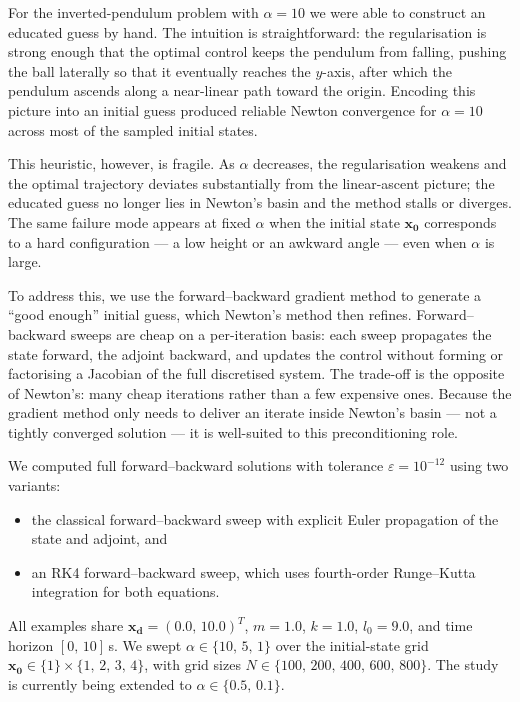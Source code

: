 \documentclass[a4paper, 10pt]{article}
\begin{document}
For the inverted-pendulum problem with $\alpha = 10$ we were able to
construct an educated guess by hand. The intuition is straightforward: the
regularisation is strong enough that the optimal control keeps the
pendulum from falling, pushing the ball laterally so that it eventually
reaches the $y$-axis, after which the pendulum ascends along a near-linear
path toward the origin. Encoding this picture into an initial guess
produced reliable Newton convergence for $\alpha = 10$ across most of the
sampled initial states.

This heuristic, however, is fragile. As $\alpha$ decreases, the
regularisation weakens and the optimal trajectory deviates substantially
from the linear-ascent picture; the educated guess no longer lies in
Newton's basin and the method stalls or diverges. The same failure mode
appears at fixed $\alpha$ when the initial state $\mathbf{x_0}$ corresponds
to a hard configuration --- a low height or an awkward angle --- even when
$\alpha$ is large.

To address this, we use the forward--backward gradient method to generate
a ``good enough'' initial guess, which Newton's method then refines.
Forward--backward sweeps are cheap on a per-iteration basis: each sweep
propagates the state forward, the adjoint backward, and updates the
control without forming or factorising a Jacobian of the full discretised
system. The trade-off is the opposite of Newton's: many cheap iterations
rather than a few expensive ones. Because the gradient method only needs
to deliver an iterate inside Newton's basin --- not a tightly converged
solution --- it is well-suited to this preconditioning role.

We computed full forward--backward solutions with tolerance
$\varepsilon = 10^{-12}$ using two variants:
\begin{itemize}
    \item the classical forward--backward sweep with explicit Euler
    propagation of the state and adjoint, and
    \item an RK4 forward--backward sweep, which uses fourth-order
    Runge--Kutta integration for both equations.
\end{itemize}
All examples share $\mathbf{x_d} = (0.0,\,10.0)^{T}$, $m = 1.0$, $k = 1.0$,
$l_0 = 9.0$, and time horizon $[0,\,10]$\,s. We swept
$\alpha \in \{10,\,5,\,1\}$ over the initial-state grid
$\mathbf{x_0} \in \{1\}\times\{1,\,2,\,3,\,4\}$, with grid sizes
$N \in \{100,\,200,\,400,\,600,\,800\}$. The study is currently
being extended to $\alpha \in \{0.5,\,0.1\}$.
\end{document}
